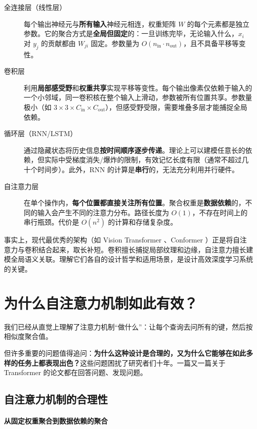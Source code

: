 \begin{description}
    \item[全连接层（线性层）] 每个输出神经元与\textbf{所有输入}神经元相连，权重矩阵 $W$ 的每个元素都是独立参数。它的聚合方式是\textbf{全局但固定}的：一旦训练完毕，无论输入什么，$x_i$ 对 $y_j$ 的贡献都由 $W_{ji}$ 固定。参数量为 $O(n_{\text{in}} \cdot n_{\text{out}})$，且不具备平移等变性。
    \item[卷积层] 利用\textbf{局部感受野}和\textbf{权重共享}实现平移等变性。每个输出像素仅依赖于输入的一个小邻域，同一卷积核在整个输入上滑动，参数被所有位置共享。参数量极小（如 $3\times3\times C_{\text{in}}\times C_{\text{out}}$），但感受野受限，需要堆叠多层才能捕捉全局依赖。
    \item[循环层（RNN/LSTM）] 通过隐藏状态将历史信息\textbf{按时间顺序逐步传递}。理论上可以建模任意长的依赖，但实际中受梯度消失/爆炸的限制，有效记忆长度有限（通常不超过几十个时间步）。此外，RNN 的计算是\textbf{串行}的，无法充分利用并行硬件。
    \item[自注意力层] 在单个操作内，\textbf{每个位置都直接关注所有位置}。聚合权重是\textbf{数据依赖}的，不同的输入会产生不同的注意力分布。路径长度为 $O(1)$，不存在时间上的串行瓶颈。代价是 $O(n^2)$ 的计算和存储复杂度。
\end{description}

事实上，现代最优秀的架构（如 Vision Transformer \cite{dosovitskiy2021imageworth16x16words}、Conformer \cite{gulati2020conformerconvolutionaugmentedtransformerspeech}）正是将自注意力与卷积结合起来，取长补短。卷积擅长捕捉局部纹理和边缘，自注意力擅长建模全局语义关联。理解它们各自的设计哲学和适用场景，是设计高效深度学习系统的关键。

\section{为什么自注意力机制如此有效？}

我们已经从直觉上理解了注意力机制“做什么”：让每个查询去问所有的键，然后按相似度聚合值。

但许多重要的问题值得追问：\textbf{为什么这种设计是合理的，又为什么它能够在如此多样的任务上都表现出色？}这些问题困扰了研究者们十年。一篇又一篇关于 Transformer 的论文都在回答问题、发现问题。

\subsection{自注意力机制的合理性}

\paragraph{从固定权重聚合到数据依赖的聚合}

